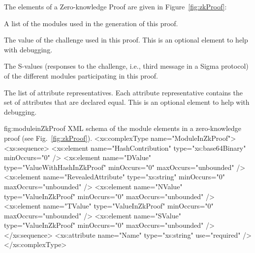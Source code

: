\vspace{3pt}\noindent The elements of a Zero-knowledge Proof are given in Figure~\ref{fig:zkProof}:
\begin{parameter}
A list of the modules used in the generation of this proof.
\end{parameter}
\begin{parameter}

\end{parameter}
\begin{parameter}
The value of the challenge used in this proof. This is an optional element to help with debugging.
\end{parameter}
\begin{parameter}
The S-values (responses to the challenge, i.e., third message in a Sigma protocol) of the different 
modules participating in this proof.
\end{parameter}
\begin{parameter}
The list of attribute representatives. Each attribute representative contains the set of attributes that are
declared equal. This is an optional element to help with debugging.
\end{parameter}



\begin{xml}
{fig:moduleinZkProof}
{XML schema of the module elements in a zero-knowledge proof (see Fig.~\ref{fig:zkProof}).}
<xs:complexType name="ModuleInZkProof">
  <xs:sequence>
    <xs:element name="HashContribution" type="xs:base64Binary"
      minOccurs="0" />
    <xs:element name="DValue" type="ValueWithHashInZkProof" minOccurs="0"
      maxOccurs="unbounded" />
    <xs:element name="RevealedAttribute" type="xs:string" minOccurs="0"
      maxOccurs="unbounded" />
    <xs:element name="NValue" type="ValueInZkProof" minOccurs="0"
      maxOccurs="unbounded" />
    <xs:element name="TValue" type="ValueInZkProof" minOccurs="0"
      maxOccurs="unbounded" />
    <xs:element name="SValue" type="ValueInZkProof" minOccurs="0"
      maxOccurs="unbounded" />
  </xs:sequence>
  <xs:attribute name="Name" type="xs:string" use="required" />
</xs:complexType>
\end{xml}


